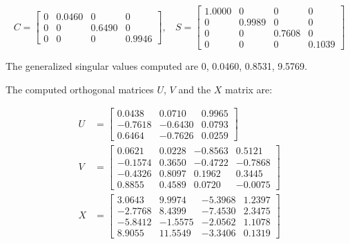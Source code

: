 \begin{enumerate}[(1).]
            \begin{equation*}
                C = \begin{bmatrix}
                     0  &  0.0460  &       0  &       0 \\ 
                     0  &       0  &  0.6490  &       0 \\
                     0  &       0  &       0  &  0.9946
                \end{bmatrix}, \ \ \ \
                S = \begin{bmatrix}
                    1.0000  &       0  &       0  &       0 \\
                         0  &  0.9989  &       0  &       0 \\
                         0  &       0  &  0.7608  &       0 \\
                         0  &       0  &       0  &  0.1039 
                \end{bmatrix}
            \end{equation*}
    
            The generalized singular values computed are 0, 0.0460, 0.8531, 9.5769.
            
            The computed orthogonal matrices $U$, $V$ and the $X$ matrix are:
    
            \begin{align*}
                U &= \begin{bmatrix}
                    0.0438  &  0.0710  &  0.9965 \\
                   -0.7618  & -0.6430  &  0.0793 \\
                    0.6464  & -0.7626  &  0.0259
                \end{bmatrix} \\
                V &= \begin{bmatrix}
                    0.0621  &  0.0228  & -0.8563 &   0.5121 \\
                   -0.1574  &  0.3650  & -0.4722 &  -0.7868 \\
                   -0.4326  &  0.8097  &  0.1962 &   0.3445 \\
                    0.8855  &  0.4589  &  0.0720 &  -0.0075
                \end{bmatrix} \\
                X &= \begin{bmatrix}
                    3.0643 &   9.9974 &  -5.3968 &  1.2397 \\
                   -2.7768 &   8.4399 &  -7.4530 &  2.3475 \\
                   -5.8412 &  -1.5575 &  -2.0562 &  1.1078 \\
                    8.9055 &  11.5549 &  -3.3406 &  0.1319 
                \end{bmatrix} 
            \end{align*}
        

\end{enumerate}
